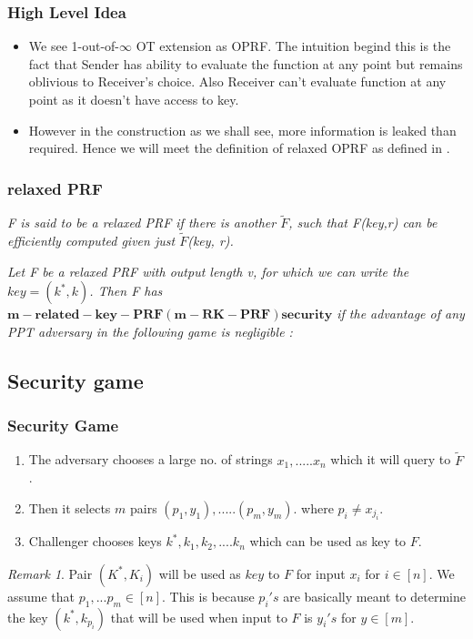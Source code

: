 \documentclass[hyperref={pdfpagelabels=false}]{beamer}
\theoremstyle{remark}
\newtheorem*{remark}{Remark}
\begin{document}
\begin{frame}
\frametitle{High Level Idea}
\begin{itemize}
\item We see 1-out-of-$\infty$ OT extension as OPRF. The intuition begind this is the fact that Sender has ability to  evaluate the function at any point but remains oblivious to Receiver's choice. Also Receiver can't evaluate function at any point as it doesn't have access to key.\pause

\item However in the construction as we shall see, more information is leaked than required. Hence we will meet the definition of \textsf{relaxed OPRF} as defined in \cite{FIPR}.

\end{itemize}
\end{frame}

\begin{frame}
\frametitle{relaxed PRF}
\begin{definition}[3]
\textit{F is said to be a \textsf{relaxed PRF} if there is another $\widetilde{F}$, such that F(key,r) can be efficiently computed given just $\widetilde{F}$(key, r).}
\end{definition}\pause

\begin{definition}[4]
\textit{Let F be a relaxed PRF with output length v, for which we can write the $key = (k^*,k)$. Then F has $\mathbf{m-related-key-PRF (m-RK-PRF) security}$ if the advantage of any PPT adversary in the following game is negligible :
}
\end{definition}
\end{frame}
\subsection{Security game}
\begin{frame}
\frametitle{Security Game}
\begin{enumerate}
\item The adversary chooses a large no. of strings $x_1,.....x_n$ which it will query to $\widetilde{F}$.\pause
\item Then it selects $m$ pairs $(p_1,y_1),.....(p_m,y_m)$. where $p_i \neq x_{j_i}$.\pause
\item Challenger chooses keys $k^*, k_1, k_2, ....k_n$ which can be used as key to $F$.\pause

\end{enumerate}

\begin{remark}
Pair $(K^*,K_i)$ will be used as $key$ to $F$ for input $x_i$ for $i \in \left[n\right] $.
We assume that $p_1,...p_m \in \left[n\right]$. This is because $p_i's$ are basically meant to determine the key $(k^*,k_{p_i})$ that will be used when  input to $F$ is $y_i's$ for $y \in \left[m\right]$.
\end{remark}

\end{frame}
\end{document}
